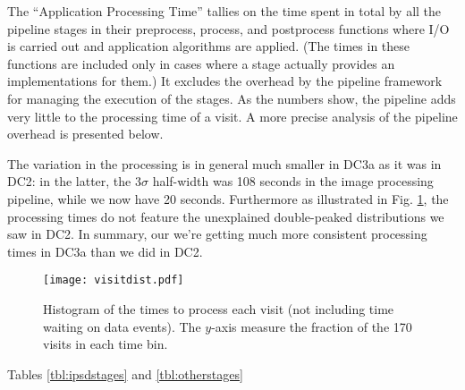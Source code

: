 The ``Application Processing Time'' tallies on the time spent in total
by all the pipeline stages in their preprocess, process, and
postprocess functions where I/O is carried out and application
algorithms are applied.  (The times in these functions are included
only in cases where a stage actually provides an implementations for
them.)  It excludes the overhead by the pipeline framework for
managing the execution of the stages.  As the numbers show, the
pipeline adds very little to the processing time of a visit.  A more
precise analysis of the pipeline overhead is presented below.  

The variation in the processing is in general much smaller in DC3a as
it was in DC2: in the latter, the $3\sigma$ half-width was 108
seconds in the image processing pipeline, while we now have 20
seconds.  Furthermore as illustrated in Fig. \ref{fig:visitdist}, the
processing times do not feature the unexplained double-peaked
distributions we saw in DC2.  In summary, our we're getting much more
consistent processing times in DC3a than we did in DC2.  

\begin{figure}[htbp]
\begin{center}
\texttt{[image: visitdist.pdf]}
\caption{Histogram of the times to process each visit (not including
  time waiting on data events).  The $y$-axis measure the fraction of
  the 170 visits in each time bin.  
\label{fig:visitdist}}
\end{center}
\end{figure}

Tables \ref{tbl:ipsdstages} and \ref{tbl:otherstages}

